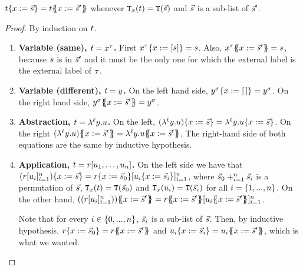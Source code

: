 \begin{lemma}
$t\{x := \vec{s}\} = t\{\!\!\{x := \vec{s}'\}\!\!\}$
whenever $\mathtt{T}_{x}(t) = \mathtt{T}(\vec{s})$ and $\vec{s}$ is a sub-list of $\vec{s}'$.
\end{lemma}
\begin{proof}
By induction on $t$.
\begin{enumerate}
\item {\bf Variable (same), $t = x^\tau$.}
  First $x^\tau\{x := [s]\} = s$.
  Also, $x^\tau\{\!\!\{x := \vec{s}'\}\!\!\} = s$,
  because $s$ is in $\vec{s}'$ and it must be the only one for which the external label is the external label of $\tau$.
\item {\bf Variable (different), $t = y$.}
  On the left hand side, $y^\sigma\{x := [\,]\} = y^\sigma$.
  On the right hand side, $y^\sigma\{\!\!\{x := \vec{s}'\}\!\!\} = y^\sigma$.
\item {\bf Abstraction, $t = \lambda^{\ell} y. u$.}
  On the left, $(\lambda^{\ell} y. u)\{x := \vec{s}\} = \lambda^{\ell} y. u\{x := \vec{s}\}$.
  On the right $(\lamp{\lab}{\vartwo}{\tmthree})\sub{\var}{\ls{\tmtwo}'} = \lamp{\lab}{\vartwo}{\tmthree\sub{\var}{\ls{\tmtwo}'}}$.
  The right-hand side of both equations are the same by inductive hypothesis.
\item {\bf Application, $t = r [u_1, \hdots, u_n]$.}
  On the left side we have that
    $(r [u_i]_{i=1}^n)\{x := \vec{s}\} =
      r\{x := \vec{s}_0\} [u_i\{x := \vec{s}_i\}]_{i=1}^n$, where
      $\vec{s}_0 +_{i=1}^{n} \vec{s}_i$ is a permutation of $\vec{s}$,
      $\mathtt{T}_{x}(t) = \mathtt{T}(\vec{s}_0)$ and
      $\mathtt{T}_{x}(u_i) = \mathtt{T}(\vec{s}_i)$ for all $i = \{1,...,n\}$.
  On the other hand, $((\tmfour [\tmthree_i]_{i=1}^n))\sub{\var}{\ls{\tmtwo}'} =
      \tmfour\sub{\var}{\ls{\tmtwo}'} [\tmthree_i\sub{\var}{\ls{\tmtwo}'}]_{i=1}^n$.

  Note that for every $i \in \{0, ..., n\}$, $\vec{s}_i$ is a sub-list of $\vec{s}$.
  Then, by inductive hypothesis, $r\{x := \vec{s}_0\} = r\{\!\!\{x := \vec{s}'\}\!\!\}$
  and $u_i\{x := \vec{s}_i\} = u_i\{\!\!\{x := \vec{s}'\}\!\!\}$, which is what we wanted.
\end{enumerate}
\end{proof}

